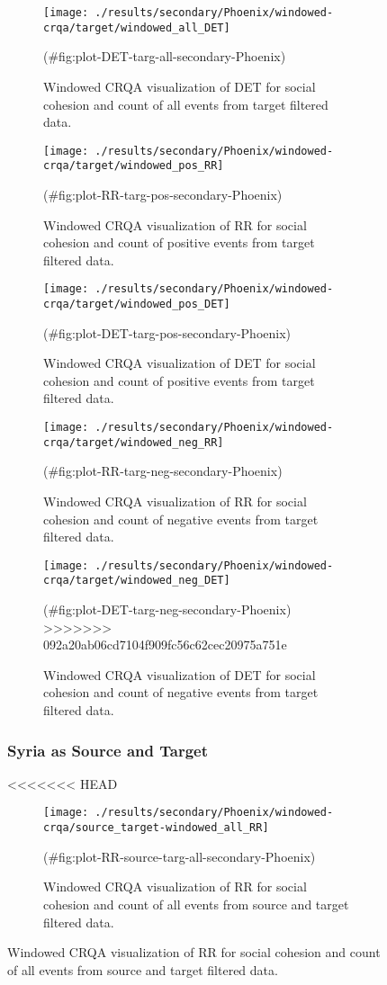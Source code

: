 \begin{appendix}
\begin{figure}
\begin{figure}[!h]
\texttt{[image: ./results/secondary/Phoenix/windowed-crqa/target/windowed\_all\_DET]} \caption{Windowed CRQA visualization of DET for social cohesion and count of all events from target filtered data.}(\#fig:plot-DET-targ-all-secondary-Phoenix)
\end{figure}

\begin{figure}[!h]
\texttt{[image: ./results/secondary/Phoenix/windowed-crqa/target/windowed\_pos\_RR]} \caption{Windowed CRQA visualization of RR for social cohesion and count of positive events from target filtered data.}(\#fig:plot-RR-targ-pos-secondary-Phoenix)
\end{figure}

\begin{figure}[!h]
\texttt{[image: ./results/secondary/Phoenix/windowed-crqa/target/windowed\_pos\_DET]} \caption{Windowed CRQA visualization of DET for social cohesion and count of positive events from target filtered data.}(\#fig:plot-DET-targ-pos-secondary-Phoenix)
\end{figure}

\begin{figure}[!h]
\texttt{[image: ./results/secondary/Phoenix/windowed-crqa/target/windowed\_neg\_RR]} \caption{Windowed CRQA visualization of RR for social cohesion and count of negative events from target filtered data.}(\#fig:plot-RR-targ-neg-secondary-Phoenix)
\end{figure}

\begin{figure}[!h]
\texttt{[image: ./results/secondary/Phoenix/windowed-crqa/target/windowed\_neg\_DET]} \caption{Windowed CRQA visualization of DET for social cohesion and count of negative events from target filtered data.}(\#fig:plot-DET-targ-neg-secondary-Phoenix)
>>>>>>> 092a20ab06cd7104f909fc56c62cec20975a751e
\end{figure}

\hypertarget{syria-as-source-and-target}{%
\subsubsection{Syria as Source and
Target}\label{syria-as-source-and-target}}

<<<<<<< HEAD
\begin{figure}
\texttt{[image: ./results/secondary/Phoenix/windowed-crqa/source\_target-windowed\_all\_RR]} \caption{Windowed CRQA visualization of RR for social cohesion and count of all events from source and target filtered data.}(\#fig:plot-RR-source-targ-all-secondary-Phoenix)
\end{figure}


\end{figure}
\end{appendix}
